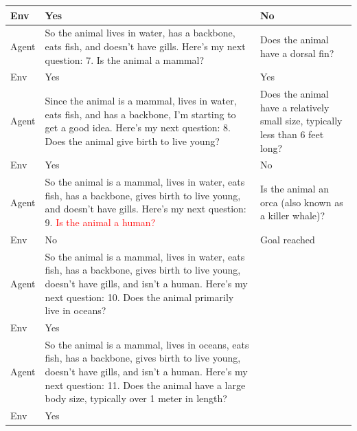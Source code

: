 \documentclass{article}
\theoremstyle{plain}
\theoremstyle{definition}
\theoremstyle{remark}
\begin{document}
\begin{table}[h]
{\begin{tabular}{|p{1cm} | p{7cm} | p{7cm}|}
        \hline
        Env & Yes & No \\
        \hline
        Agent & So the animal lives in water, has a backbone, eats fish, and doesn't have gills. Here's my next question: 7. Is the animal a mammal? & Does the animal have a dorsal fin? \\
        \hline
        Env & Yes & Yes \\
        \hline
        Agent & Since the animal is a mammal, lives in water, eats fish, and has a backbone, I'm starting to get a good idea. Here's my next question: 8. Does the animal give birth to live young? & Does the animal have a relatively small size, typically less than 6 feet long? \\
        \hline
        Env & Yes & No \\
        \hline
        Agent & So the animal is a mammal, lives in water, eats fish, has a backbone, gives birth to live young, and doesn't have gills. Here's my next question: 9. \textcolor{red}{Is the animal a human?} & Is the animal an orca (also known as a killer whale)? \\
        \hline
        Env & No & Goal reached \\
        \hline
        Agent & So the animal is a mammal, lives in water, eats fish, has a backbone, gives birth to live young, doesn't have gills, and isn't a human. Here's my next question: 10. Does the animal primarily live in oceans? &  \\
        \hline
        Env & Yes &  \\
        \hline
        Agent & So the animal is a mammal, lives in oceans, eats fish, has a backbone, gives birth to live young, doesn't have gills, and isn't a human. Here's my next question: 11. Does the animal have a large body size, typically over 1 meter in length? & \\
        \hline
        Env & Yes & \\
        \bottomrule
        \end{tabular}
    }
    \vspace{-0.3cm}
\end{table}
\newpage
\end{document}
